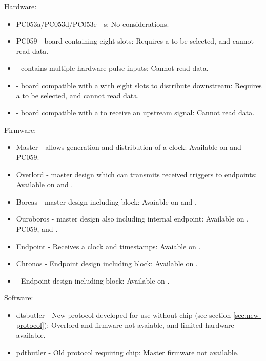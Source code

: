\documentclass{dune}
\begin{document}
Hardware:
\begin{itemize}
    \item PC053a/PC053d/PC053e - s: No considerations.
    \item PC059 - board containing eight  slots: Requires a  to be selected, and cannot read  data.
    \item {} - contains multiple hardware pulse inputs: Cannot read  data.
    \item {} - board compatible with a  with eight  slots to distribute downstream: Requires a  to be selected, and cannot read  data.
    \item {} - board compatible with a  to receive an upstream signal: Cannot read  data.
\end{itemize}

Firmware:
\begin{itemize}
    \item Master - allows generation and distribution of a clock: Available on  and PC059.
    \item Overlord - master design which can transmits received triggers to endpoints: Available on  and .
    \item Boreas - master design including  block: Avaiable on  and .
    \item Ouroboros - master design also including internal endpoint: Available on , PC059, and .
    \item Endpoint - Receives a clock and timestamps: Avaiable on .
    \item Chronos - Endpoint design including  block: Available on .
    \item {} - Endpoint design including  block: Available on .
\end{itemize}

Software:
\begin{itemize}
    \item dtsbutler - New protocol developed for use without  chip (see section \ref{sec:new-protocol}): Overlord and  firmware not avaiable, and limited hardware available.
    \item pdtbutler - Old protocol requiring  chip: Master firmware not available.
\end{itemize}
\end{document}
